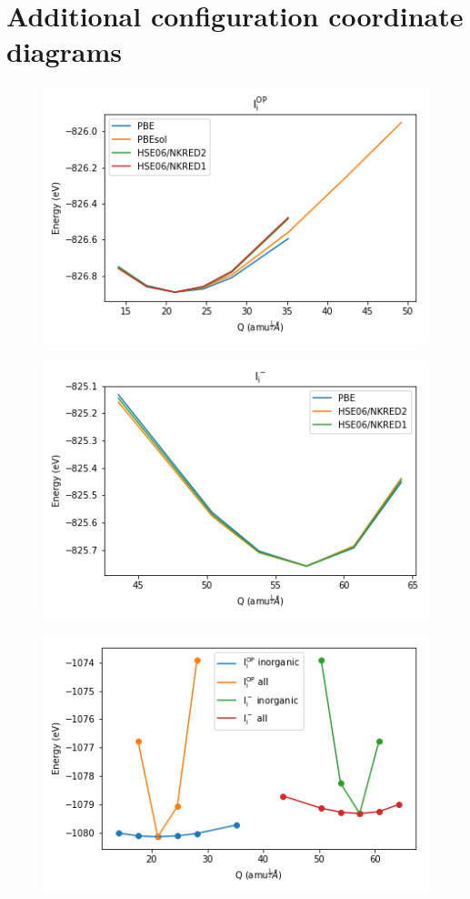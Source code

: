 \chapter{\label{app:9-configcoord}Additional configuration coordinate diagrams}

\begin{figure}[h!]   %
\centering
  \includegraphics[width=0.7\columnwidth]{figures/ch6/neutral_comparison.png}
  \caption[]{}
\label{schrodinger}
\end{figure}
\begin{figure}[h!]   %
\centering
  \includegraphics[width=0.7\columnwidth]{figures/ch6/negative_comparison.png}
  \caption[]{}
\label{schrodinger}
\end{figure}


\begin{figure}[h!]   %
\centering
  \includegraphics[width=0.7\columnwidth]{figures/ap9/organic_inorganic.png}
  \caption[]{}
\label{schrodinger}
\end{figure}
